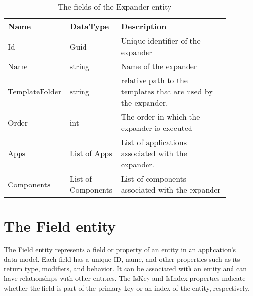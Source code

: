 \begin{table}[H]
\small
\begin{tabular}{ p{0.20\linewidth} p{0.22\linewidth} p{0.48\linewidth} }
\hline
\textbf{Name} & \textbf{DataType} & \textbf{Description} \\
\hline
Id & Guid & Unique identifier of the expander \\
Name & string & Name of the expander \\
TemplateFolder & string & relative path to the templates that are used by the expander. \\
Order & int & The order in which the expander is executed \\
Apps & List of Apps & List of applications associated with the expander. \\
Components & List of Components & List of components associated with the expander \\
\hline
\end{tabular}
\caption{The fields of the Expander entity}
\label{table:expander_entity}
\end{table}

\section{The Field entity}

The Field entity represents a field or property of an entity in an application's data
model. Each field has a unique ID, name, and other properties such as its return type,
modifiers, and behavior. It can be associated with an entity and can have relationships
with other entities. The IsKey and IsIndex properties indicate whether the field is part
of the primary key or an index of the entity, respectively.

